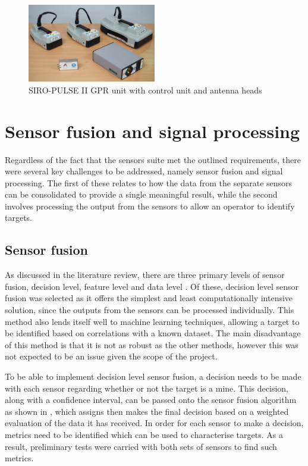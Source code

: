 \documentclass[main.tex]{subfiles}
\begin{document}
\begin{figure}[ht]
\includegraphics[width=0.5\textwidth]{3-ConceptDesign/SiroPulse.JPG}
\centering
\caption{SIRO-PULSE II GPR unit with control unit and antenna heads} 
\end{figure}

\section{Sensor fusion and signal processing}
Regardless of the fact that the sensors suite met the outlined requirements, there were several key challenges to be addressed, namely sensor fusion and signal processing. The first of these relates to how the data from the separate sensors can be consolidated to provide a single meaningful result, while the second involves processing the output from the sensors to allow an operator to identify targets. 

\subsection{Sensor fusion}
As discussed in the literature review, there are three primary levels of sensor fusion, decision level, feature level and data level \parencite{Yarovoy2009}. Of these, decision level sensor fusion was selected as it offers the simplest and least computationally intensive solution, since the outputs from the sensors can be processed individually. This method also lends itself well to machine learning techniques, allowing a target to be identified based on correlations with a known dataset. The main disadvantage of this method is that it is not as robust as the other methods, however this was not expected to be an issue given the scope of the project. 

To be able to implement decision level sensor fusion, a decision needs to be made with each sensor regarding whether or not the target is a mine. This decision, along with a confidence interval, can be passed onto the sensor fusion algorithm as shown in , which assigns then makes the final decision based on a weighted evaluation of the data it has received. In order for each sensor to make a decision, metrics need to be identified which can be used to characterise targets. As a result, preliminary tests were carried with both sets of sensors to find such metrics.
\end{document}
